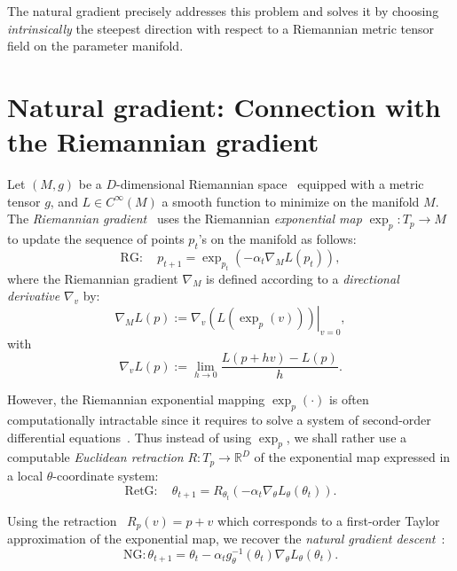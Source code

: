 \documentclass[11pt]{article}
\def\bbR{\mathbb{R}}
\begin{document}
The natural gradient precisely addresses  this problem and solves it by choosing {\em intrinsically} the steepest direction with respect to a Riemannian metric tensor field on the parameter manifold.

\section{Natural gradient: Connection with the Riemannian gradient}

Let $(M,g)$ be a $D$-dimensional Riemannian space~\cite{DG-2016} equipped with a metric tensor $g$, and $L\in C^\infty(M)$ a smooth function to minimize on  the manifold $M$.
The {\em Riemannian gradient}~\cite{Bonnabel-2013} uses the Riemannian  {\em exponential map} 
$\exp_{p}: T_p\rightarrow M$ to update the sequence of points 
$p_t$'s on the manifold as follows:
\begin{equation}
\mathrm{RG}:\quad p_{t+1} =  \exp_{p_t}(-\alpha_t \nabla_{M} L(p_t)),
\end{equation}
where the Riemannian gradient $\nabla_{M}$ is defined according to a {\em directional derivative} $\nabla_v$ by:
\begin{equation}
\nabla_{M} L(p):=\left.\nabla_v\left(L\left(\exp_p(v)\right)\right)\right|_{v=0},
\end{equation}
with
\begin{equation}
\nabla_{v} L(p) :=\lim_{h\rightarrow 0} \frac{L(p+hv)-L(p)}{h}.
\end{equation}

However, the Riemannian exponential mapping $\exp_p(\cdot)$ is often computationally intractable since it requires to solve a system of second-order differential equations~\cite{DG-2016,MatrixMfd-2009}.
Thus instead of using $\exp_p$,  we shall rather use a computable {\em Euclidean retraction} $R: T_p\rightarrow\bbR^D$ of the exponential map 
 expressed in a local $\theta$-coordinate system:
\begin{equation}
\mathrm{RetG}:\quad \theta_{t+1} =  R_{\theta_t}\left(-\alpha_t \nabla_{\theta} L_\theta(\theta_t)\right).
\end{equation}

Using the retraction~\cite{MatrixMfd-2009} $R_p(v)=p+v$ which corresponds to a first-order Taylor approximation of the exponential map, 
we recover the {\em natural gradient descent}~\cite{Amari-1998}:   
\begin{equation}
\mathrm{NG}: \theta_{t+1}= \theta_t-\alpha_t g^{-1}_\theta(\theta_t) \nabla_{\theta} L_\theta(\theta_t).
\end{equation}
\end{document}
